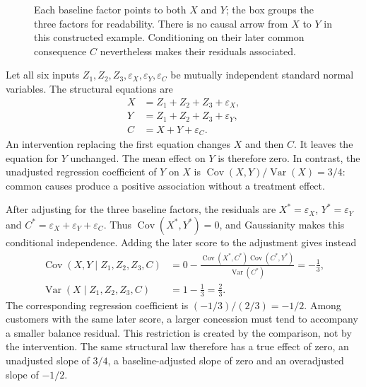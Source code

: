 \begin{figure}[htbp]
\centering
{}
\caption{Each baseline factor points to both $X$ and $Y$; the box groups the
three factors for readability. There is no causal arrow from $X$ to $Y$ in
this constructed example. Conditioning on their later common consequence
$C$ nevertheless makes their residuals associated.}
\label{repair29:collider}
\end{figure}

Let all six inputs $Z_1,Z_2,Z_3,\varepsilon_X,\varepsilon_Y,\varepsilon_C$
be mutually independent standard normal variables. The structural equations
are
\begin{align}
X&=Z_1+Z_2+Z_3+\varepsilon_X,\\
Y&=Z_1+Z_2+Z_3+\varepsilon_Y,\\
C&=X+Y+\varepsilon_C.
\end{align}
An intervention replacing the first equation changes $X$ and then $C$.
It leaves the equation for $Y$ unchanged. The mean effect on $Y$ is therefore
zero. In contrast, the unadjusted regression coefficient of $Y$ on $X$ is
$\operatorname{Cov}(X,Y)/\operatorname{Var}(X)=3/4$: common causes produce a
positive association without a treatment effect.

After adjusting for the three baseline factors, the residuals are
$X^*=\varepsilon_X$, $Y^*=\varepsilon_Y$ and
$C^*=\varepsilon_X+\varepsilon_Y+\varepsilon_C$. Thus
$\operatorname{Cov}(X^*,Y^*)=0$, and Gaussianity makes this conditional
independence. Adding the later score to the adjustment gives instead
\begin{align}
\operatorname{Cov}(X,Y\mid Z_1,Z_2,Z_3,C)
 &=0-\frac{\operatorname{Cov}(X^*,C^*)
                 \operatorname{Cov}(C^*,Y^*)}{\operatorname{Var}(C^*)}
 =-\frac13,\\
\operatorname{Var}(X\mid Z_1,Z_2,Z_3,C)&=1-\frac13=\frac23.
\end{align}
The corresponding regression coefficient is $(-1/3)/(2/3)=-1/2$.
Among customers with the same later score, a larger concession must tend
to accompany a smaller balance residual. This restriction is created by the
comparison, not by the intervention. The same structural law therefore has
a true effect of zero, an unadjusted slope of $3/4$, a baseline-adjusted slope
of zero and an overadjusted slope of $-1/2$.

